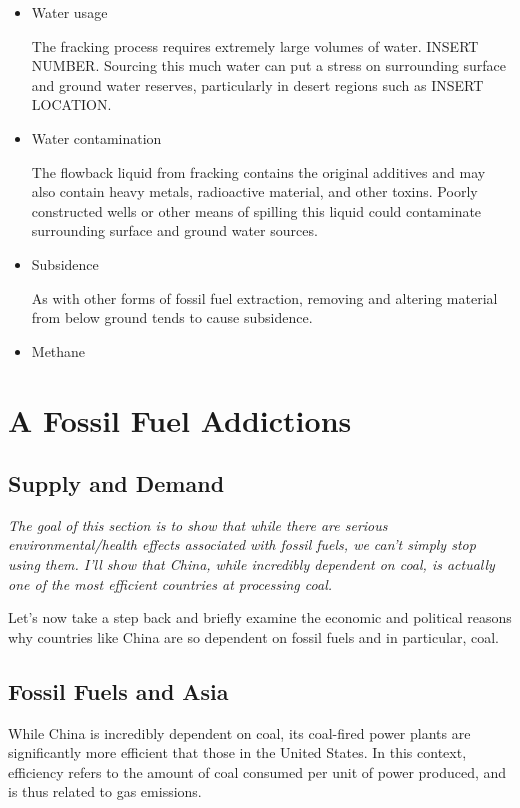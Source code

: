 \begin{itemize}
\item Water usage 

The fracking process requires extremely large volumes of water. INSERT NUMBER. Sourcing this much water can put a stress on surrounding surface and ground water reserves, particularly in desert regions such as INSERT LOCATION.

\item Water contamination 

The flowback liquid from fracking contains the original additives and may also contain heavy metals, radioactive material, and other toxins. Poorly constructed wells or other means of spilling this liquid could contaminate surrounding surface and ground water sources. 



\item Subsidence

As with other forms of fossil fuel extraction, removing and altering material from below ground tends to cause subsidence.

\item Methane

\end{itemize}


\section{A Fossil Fuel Addictions}


\subsection{Supply and Demand}

\emph{The goal of this section is to show that while there are serious environmental/health effects associated with fossil fuels, we can't simply stop using them. I'll show that China, while incredibly dependent on coal, is actually one of the most efficient countries at processing coal. }

Let's now take a step back and briefly examine the economic and political reasons why countries like China are so dependent on fossil fuels and in particular, coal.  

\subsection{Fossil Fuels and Asia}

While China is incredibly dependent on coal, its coal-fired power plants are significantly more efficient that those in the United States. In this context, efficiency refers to the amount of coal consumed per unit of power produced, and is thus related to gas emissions. 

